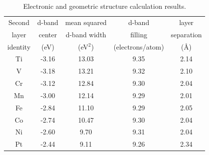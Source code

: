 \documentclass[aps,preprint,superscriptaddress,endfloats*]{revtex4}
\begin{document}
\begin{table}%
\caption{\label{tab1}Electronic and geometric structure calculation results.}
\begin{ruledtabular}
\begin{tabular}{ccccc}
\hline
Second & d-band & mean squared  & d-band & layer\\
layer  & center &  d-band width & filling & separation\\
identity & (eV) & (eV$^2$) & (electrons/atom) & (\AA) \\\hline
Ti & -3.16 & 13.03 & 9.35 & 2.14 \\\hline
V & -3.18 & 13.21 & 9.32 & 2.10  \\\hline
Cr & -3.12 & 12.84 & 9.30 & 2.04 \\\hline
Mn & -3.00 & 12.14 & 9.29 & 2.01 \\\hline
Fe & -2.84 & 11.10 & 9.29 & 2.05 \\\hline
Co & -2.74 & 10.47 & 9.30 & 2.04 \\\hline
Ni & -2.60 & 9.70 & 9.31 & 2.04 \\\hline
Pt & -2.44 & 9.11 & 9.26 & 2.34 \\\hline
\end{tabular}
\end{ruledtabular}
\end{table}
\end{document}
